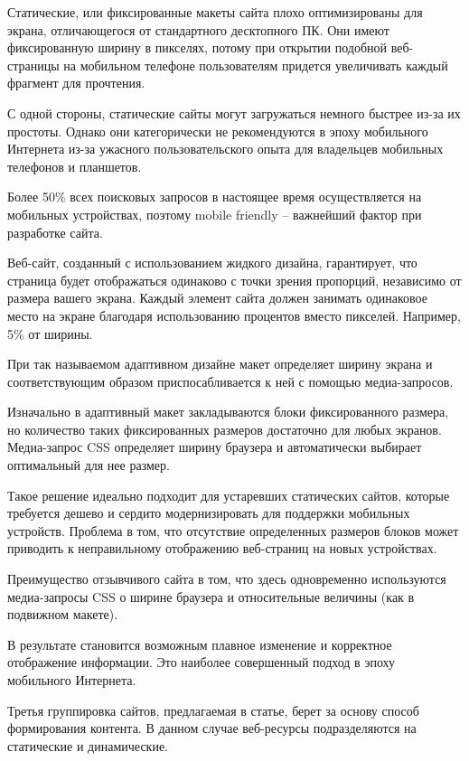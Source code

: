 Статические, или фиксированные макеты сайта плохо оптимизированы для экрана, отличающегося от стандартного десктопного ПК.
Они имеют фиксированную ширину в пикселях, потому при открытии подобной веб-страницы на мобильном телефоне пользователям придется увеличивать каждый фрагмент для прочтения.

С одной стороны, статические сайты могут загружаться немного быстрее из-за их простоты. Однако они категорически не рекомендуются в эпоху мобильного Интернета из-за ужасного пользовательского опыта для владельцев мобильных телефонов и планшетов.

Более 50\% всех поисковых запросов в настоящее время осуществляется на мобильных устройствах, поэтому mobile friendly – важнейший фактор при разработке сайта.

Веб-сайт, созданный с использованием жидкого дизайна, гарантирует, что страница будет отображаться одинаково с точки зрения пропорций, независимо от размера вашего экрана.
Каждый элемент сайта должен занимать одинаковое место на экране благодаря использованию процентов вместо пикселей.
Например, 5\% от ширины.

При так называемом адаптивном дизайне макет определяет ширину экрана и соответствующим образом приспосабливается к ней с помощью медиа-запросов.

Изначально в адаптивный макет закладываются блоки фиксированного размера, но количество таких фиксированных размеров достаточно для любых экранов.
Медиа-запрос CSS определяет ширину браузера и автоматически выбирает оптимальный для нее размер.

Такое решение идеально подходит для устаревших статических сайтов, которые требуется дешево и сердито модернизировать для поддержки мобильных устройств.
Проблема в том, что отсутствие определенных размеров блоков может приводить к неправильному отображению веб-страниц на новых устройствах.

Преимущество отзывчивого сайта в том, что здесь одновременно используются медиа-запросы CSS о ширине браузера и относительные величины (как в подвижном макете).

В результате становится возможным плавное изменение и корректное отображение информации.
Это наиболее совершенный подход в эпоху мобильного Интернета.

Третья группировка сайтов, предлагаемая в статье, берет за основу способ формирования контента.
В данном случае веб-ресурсы подразделяются на статические и динамические.

